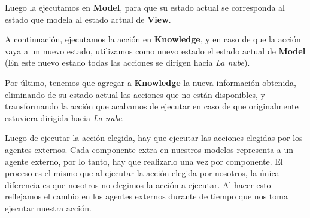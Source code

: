 Luego la ejecutamos en \textbf{Model}, para que su estado actual se corresponda al estado que modela al estado actual de \textbf{View}.

A continuación, ejecutamos la acción en \textbf{Knowledge}, y en caso de que la acción vaya a un nuevo estado, utilizamos como nuevo estado el estado actual 
de \textbf{Model} (En este nuevo estado todas las acciones se dirigen hacia \textit{La nube}).

Por último, tenemos que agregar a \textbf{Knowledge} la nueva información obtenida, eliminando de su estado actual las acciones que no están disponibles, y 
transformando la acción que acabamos de ejecutar en caso de que originalmente estuviera dirigida hacia \textit{La nube}.

Luego de ejecutar la acción elegida, hay que ejecutar las acciones elegidas por los agentes externos. Cada componente extra en nuestros modelos representa a un agente 
externo, por lo tanto, hay que realizarlo una vez por componente. El proceso es el mismo que al ejecutar la acción elegida por nosotros, la única diferencia es que 
nosotros no elegimos la acción a ejecutar. Al hacer esto reflejamos el cambio en los agentes externos durante de tiempo que nos toma ejecutar nuestra acción.